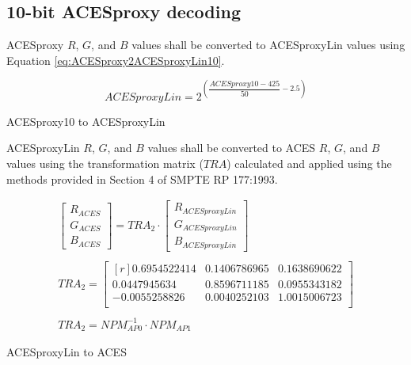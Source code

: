 \subsection{10-bit ACESproxy decoding}
ACESproxy $R$, $G$, and $B$ values shall be converted to ACESproxyLin values using Equation \ref{eq:ACESproxy2ACESproxyLin10}.

\begin{floatequ} 
\begin{equation} 
    ACESproxyLin = 2^{\left(\dfrac{ACESproxy10-425}{50}-2.5\right)}
\end{equation}
\caption{ACESproxy10 to ACESproxyLin}
\label{eq:ACESproxy2ACESproxyLin10}
\end{floatequ}

ACESproxyLin $R$, $G$, and $B$ values shall be converted to ACES $R$, $G$, and $B$ values using the transformation matrix ($TRA$) calculated and applied using the methods provided in Section 4 of SMPTE RP 177:1993.


\begin{floatequ} 
\begin{gather}
    \begin{bmatrix}
        R_{ACES}\\
        G_{ACES}\\
        B_{ACES}
    \end{bmatrix}
    =
    TRA_{2}
    \cdot
    \begin{bmatrix}
        R_{ACESproxyLin}\\
        G_{ACESproxyLin}\\
        B_{ACESproxyLin}
    \end{bmatrix} \\
    \\
    TRA_{2} =
    \begin{bmatrix*}[r]
        0.6954522414 & 0.1406786965 & 0.1638690622 \\
        0.0447945634 & 0.8596711185 & 0.0955343182 \\
        -0.0055258826 & 0.0040252103 & 1.0015006723 \\
    \end{bmatrix*} \\
    \\
    TRA_{2} = NPM^{-1}_{AP0} \cdot NPM_{AP1}
\end{gather}
\caption{ACESproxyLin to ACES}
\label{eq:ACESproxyLin2ACES10}
\end{floatequ}


